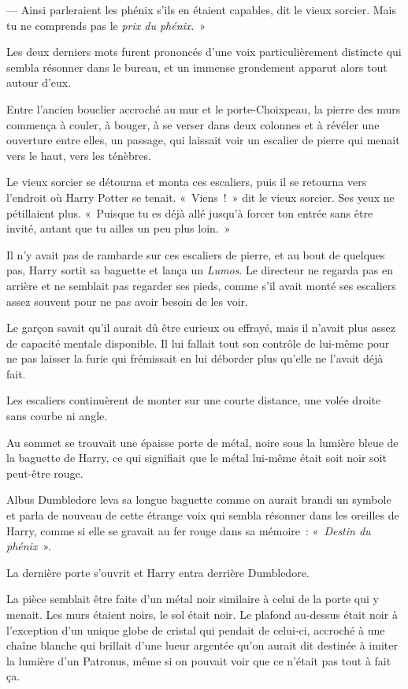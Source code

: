 --- Ainsi parleraient les phénix s'ils en étaient capables, dit le vieux sorcier. Mais tu ne comprends pas le \emph{prix du phénix}.~»

Les deux derniers mots furent prononcés d'une voix particulièrement distincte qui sembla résonner dans le bureau, et un immense grondement apparut alors tout autour d'eux.

Entre l'ancien bouclier accroché au mur et le porte-Choixpeau, la pierre des murs commença à couler, à bouger, à se verser dans deux colonnes et à révéler une ouverture entre elles, un passage, qui laissait voir un escalier de pierre qui menait vers le haut, vers les ténèbres.

Le vieux sorcier se détourna et monta ces escaliers, puis il se retourna vers l'endroit où Harry Potter se tenait. «~Viens~!~» dit le vieux sorcier. Ses yeux ne pétillaient plus. «~Puisque tu es déjà allé jusqu'à forcer ton entrée sans être invité, autant que tu ailles un peu plus loin.~»

\later

Il n'y avait pas de rambarde sur ces escaliers de pierre, et au bout de quelques pas, Harry sortit sa baguette et lança un \emph{Lumos}. Le directeur ne regarda pas en arrière et ne semblait pas regarder ses pieds, comme s'il avait monté ses escaliers assez souvent pour ne pas avoir besoin de les voir.

Le garçon savait qu'il aurait dû être curieux ou effrayé, mais il n'avait plus assez de capacité mentale disponible. Il lui fallait tout son contrôle de lui-même pour ne pas laisser la furie qui frémissait en lui déborder plus qu'elle ne l'avait déjà fait.

Les escaliers continuèrent de monter sur une courte distance, une volée droite sans courbe ni angle.

Au sommet se trouvait une épaisse porte de métal, noire sous la lumière bleue de la baguette de Harry, ce qui signifiait que le métal lui-même était soit noir soit peut-être rouge.

Albus Dumbledore leva sa longue baguette comme on aurait brandi un symbole et parla de nouveau de cette étrange voix qui sembla résonner dans les oreilles de Harry, comme si elle se gravait au fer rouge dans sa mémoire~: «~\emph{Destin du phénix}~».

La dernière porte s'ouvrit et Harry entra derrière Dumbledore.

La pièce semblait être faite d'un métal noir similaire à celui de la porte qui y menait. Les murs étaient noirs, le sol était noir. Le plafond au-dessus était noir à l'exception d'un unique globe de cristal qui pendait de celui-ci, accroché à une chaîne blanche qui brillait d'une lueur argentée qu'on aurait dit destinée à imiter la lumière d'un Patronus, même si on pouvait voir que ce n'était pas tout à fait ça.

